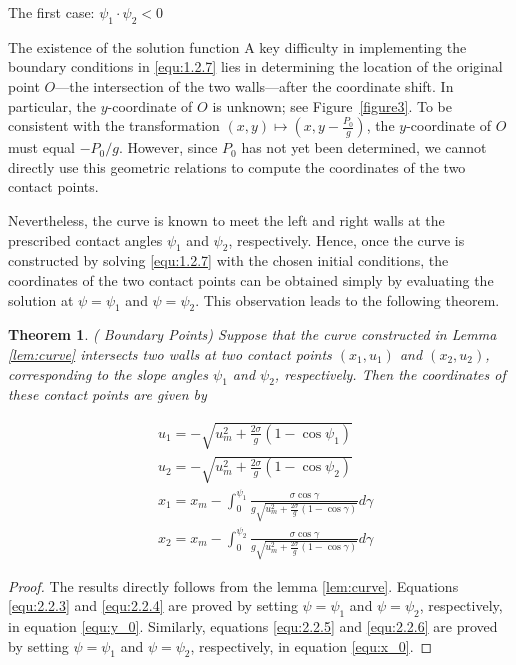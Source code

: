 \documentclass[letterpaper,reqno,10pt,twoside]{amsart}
\newtheorem{theorem}{Theorem}[section]
\theoremstyle{definition}
\theoremstyle{remark}
\begin{document}
\begin{section}{The first case: $\psi_1\cdot \psi_2<0$ }
\begin{subsection}{The existence of the solution function}
    A key difficulty in implementing the boundary conditions in \eqref{equ:1.2.7} lies in determining the location of the original point $O$—the intersection of the two walls—after the coordinate shift. In particular, the $y$-coordinate of $O$ is unknown; see Figure~\ref{figure3}. To be consistent with the transformation $(x,y)\mapsto (x,y-\tfrac{P_{0}}{g})$, the $y$-coordinate of $O$ must equal $-P_{0}/g$. However, since $P_{0}$ has not yet been determined, we cannot directly use this geometric relations to compute the coordinates of the two contact points.

Nevertheless, the curve is known to meet the left and right walls at the prescribed contact angles $\psi_{1}$ and $\psi_{2}$, respectively. Hence, once the curve is constructed by solving \eqref{equ:1.2.7} with the chosen initial conditions, the coordinates of the two contact points can be obtained simply by evaluating the solution at $\psi=\psi_{1}$ and $\psi=\psi_{2}$. This observation leads to the following theorem.
    
    \begin{theorem}( Boundary Points){\label{thm:bdd_p}} Suppose that the curve constructed in Lemma \ref{lem:curve} intersects two walls at two contact points $(x_1,u_1)$ and $(x_2,u_2)$, corresponding to the slope angles $\psi_{1}$ and $\psi_{2}$, respectively. Then the coordinates of these contact points are given by

        \begin{align}
            &u_1=-\sqrt{u_m^{2}+\frac{2\sigma}{g}(1-\cos\psi_1)} \label{equ:2.2.3}\\
             &u_2=-\sqrt{u_{m}^{2}+\frac{2\sigma}{g}(1-\cos\psi_2)} \label{equ:2.2.4}\\
              &x_1=x_m-\int_{0}^{\psi_1}\frac{\sigma\cos\gamma}{g\sqrt{u_{m}^{2}+\frac{2\sigma}{g}(1-\cos\gamma)}}d\gamma \label{equ:2.2.5}\\
              &x_2=x_m-\int_{0}^{\psi_2}\frac{\sigma\cos\gamma}{g\sqrt{u_{m}^{2}+\frac{2\sigma}{g}(1-\cos\gamma)}}d\gamma \label{equ:2.2.6}
        \end{align}
        
    \end{theorem}

    \begin{proof}

   The results directly follows from the lemma \ref{lem:curve}. Equations \eqref{equ:2.2.3} and \eqref{equ:2.2.4} are proved by setting $\psi=\psi_{1}$ and $\psi=\psi_{2}$, respectively, in equation \eqref{equ:y_0}. Similarly, equations \eqref{equ:2.2.5} and \eqref{equ:2.2.6} are proved by setting $\psi=\psi_{1}$ and $\psi=\psi_{2}$, respectively, in equation \eqref{equ:x_0}.


\end{proof}
\end{subsection}
\end{section}
\end{document}
